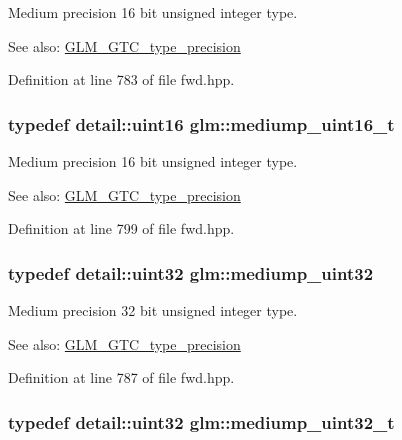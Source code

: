 Medium precision 16 bit unsigned integer type. \begin{Desc}
\item[See also:]\hyperlink{group__gtc__type__precision}{GLM\_\-GTC\_\-type\_\-precision} \end{Desc}


Definition at line 783 of file fwd.hpp.\hypertarget{group__gtc__type__precision_g0b385466deac5ac96061ef2cdd6db20f}{
\subsubsection[mediump\_\-uint16\_\-t]{\setlength{\rightskip}{0pt plus 5cm}typedef detail::uint16 {\bf glm::mediump\_\-uint16\_\-t}}}
\label{group__gtc__type__precision_g0b385466deac5ac96061ef2cdd6db20f}


Medium precision 16 bit unsigned integer type. \begin{Desc}
\item[See also:]\hyperlink{group__gtc__type__precision}{GLM\_\-GTC\_\-type\_\-precision} \end{Desc}


Definition at line 799 of file fwd.hpp.\hypertarget{group__gtc__type__precision_g861dbd1051f488e425b3966001b568e5}{
\subsubsection[mediump\_\-uint32]{\setlength{\rightskip}{0pt plus 5cm}typedef detail::uint32 {\bf glm::mediump\_\-uint32}}}
\label{group__gtc__type__precision_g861dbd1051f488e425b3966001b568e5}


Medium precision 32 bit unsigned integer type. \begin{Desc}
\item[See also:]\hyperlink{group__gtc__type__precision}{GLM\_\-GTC\_\-type\_\-precision} \end{Desc}


Definition at line 787 of file fwd.hpp.\hypertarget{group__gtc__type__precision_gc7782c1e393f9ad47e41a177a685f287}{
\subsubsection[mediump\_\-uint32\_\-t]{\setlength{\rightskip}{0pt plus 5cm}typedef detail::uint32 {\bf glm::mediump\_\-uint32\_\-t}}}
\label{group__gtc__type__precision_gc7782c1e393f9ad47e41a177a685f287}


